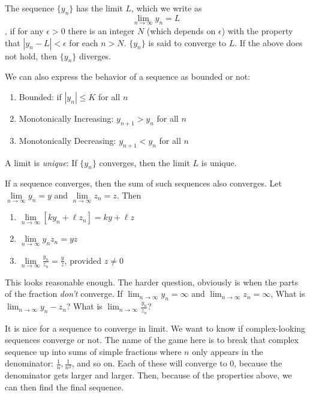 \documentclass[]{book}
\providecommand{\tightlist}{%
  \setlength{\itemsep}{0pt}\setlength{\parskip}{0pt}}
\theoremstyle{definition}
\theoremstyle{definition}
\theoremstyle{definition}
\theoremstyle{remark}
\let\BeginKnitrBlock\begin \let\EndKnitrBlock\end
\begin{document}
\BeginKnitrBlock{definition}
\protect\hypertarget{def:unnamed-chunk-2}{}{\label{def:unnamed-chunk-2} }The sequence \(\{y_n\}\) has the limit \(L\), which we write as \[\lim\limits_{n \to \infty} y_n =L\], if for any \(\epsilon>0\) there is an integer \(N\) (which depends on \(\epsilon\)) with the property that \(|y_n -L|<\epsilon\) for each \(n>N\). \(\{y_n\}\) is said to converge to \(L\). If the above does not hold, then \(\{y_n\}\) diverges.
\EndKnitrBlock{definition}

We can also express the behavior of a sequence as bounded or not:

\begin{enumerate}
\def\labelenumi{\arabic{enumi}.}
\tightlist
\item
  Bounded: if \(|y_n|\le K\) for all \(n\)
\item
  Monotonically Increasing: \(y_{n+1}>y_n\) for all \(n\)
\item
  Monotonically Decreasing: \(y_{n+1}<y_n\) for all \(n\)
\end{enumerate}

A limit is \emph{unique}: If \(\{y_n\}\) converges, then the limit \(L\) is unique.

If a sequence converges, then the sum of such sequences also converges. Let \(\lim\limits_{n \to \infty} y_n = y\) and \(\lim\limits_{n \to \infty} z_n =z\). Then

\begin{enumerate}
\def\labelenumi{\arabic{enumi}.}
\tightlist
\item
  \(\lim\limits_{n \to \infty} [k y_n + \ell z_n]= k y + \ell z\)
\item
  \(\lim\limits_{n \to \infty} y_n z_n = yz\)
\item
  \(\lim\limits_{n \to \infty} \frac{y_n}{z_n} = \frac{y}{z}\), provided \(z\neq 0\)
\end{enumerate}

This looks reasonable enough. The harder question, obviously is when the parts of the fraction \emph{don't} converge. If \(\lim_{n\to\infty} y_n = \infty\) and \(\lim_{n\to\infty} z_n = \infty\), What is \(\lim_{n\to\infty} y_n - z_n\)? What is \(\lim_{n\to\infty} \frac{y_n}{z_n}\)?

It is nice for a sequence to converge in limit. We want to know if complex-looking sequences converge or not. The name of the game here is to break that complex sequence up into sums of simple fractions where \(n\) only appears in the denominator: \(\frac{1}{n}, \frac{1}{n^2}\), and so on. Each of these will converge to 0, because the denominator gets larger and larger. Then, because of the properties above, we can then find the final sequence.
\end{document}
